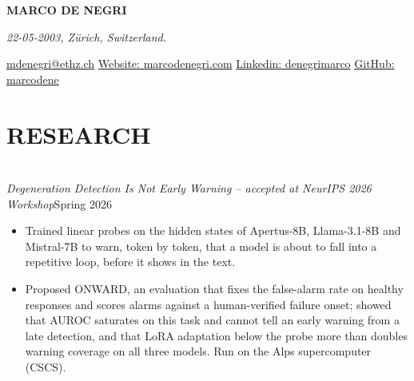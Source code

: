 \documentclass[11pt,a4paper]{article}
\begin{document}
{\fontsize{26}{30}\selectfont\textbf{MARCO DE NEGRI}}\par
\vspace{2pt}
\textit{22-05-2003, Zürich, Switzerland.}\par
\href{mailto:mdenegri@ethz.ch}{mdenegri@ethz.ch} \textbar{} \href{https://marcodenegri.com/}{Website: marcodenegri.com} \textbar{} \href{https://www.linkedin.com/in/denegrimarco}{Linkedin: denegrimarco} \textbar{} \href{https://github.com/marcodene}{GitHub: marcodene}

\vspace{-6pt}

\section{RESEARCH}

\\[-2pt]
\textit{Degeneration Detection Is Not Early Warning -- accepted at NeurIPS 2026 Workshop}\hfill Spring 2026
\begin{itemize}
  \item Trained linear probes on the hidden states of Apertus-8B, Llama-3.1-8B and Mistral-7B to warn, token by token, that a model is about to fall into a repetitive loop, before it shows in the text.
  \item Proposed ONWARD, an evaluation that fixes the false-alarm rate on healthy responses and scores alarms against a human-verified failure onset; showed that AUROC saturates on this task and cannot tell an early warning from a late detection, and that LoRA adaptation below the probe more than doubles warning coverage on all three models. Run on the Alps supercomputer (CSCS).
\end{itemize}
\end{document}
